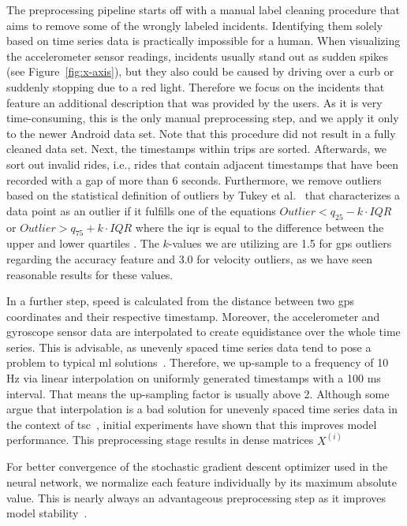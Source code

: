The preprocessing pipeline starts off with a manual label cleaning procedure that aims to remove some of the wrongly labeled incidents.
Identifying them solely based on time series data is practically impossible for a human.
When visualizing the accelerometer sensor readings, incidents usually stand out as sudden spikes (see Figure~\ref{fig:x-axis}), but they also could be caused by driving over a curb or suddenly stopping due to a red light.
Therefore we focus on the incidents that feature an additional description that was provided by the users.
As it is very time-consuming, this is the only manual preprocessing step, and we apply it only to the newer Android data set.
Note that this procedure did not result in a fully cleaned data set.
Next, the timestamps within trips are sorted.
Afterwards, we sort out invalid rides, i.e., rides that contain adjacent timestamps that have been recorded with a gap of more than 6 seconds.
Furthermore, we remove outliers based on the statistical definition of outliers by Tukey et al.~\cite{tukey1977exploratory} that characterizes a data point as an outlier if it fulfills one of the equations $Outlier < q_{25} - k \cdot IQR$ or $Outlier > q_{75} + k \cdot IQR$ where the \ac{iqr} is equal to the difference between the upper and lower quartiles \cite{upton1996understanding, zwillinger1999crc}.
The $k$-values we are utilizing are 1.5 for \ac{gps} outliers regarding the accuracy feature and 3.0 for velocity outliers, as we have seen reasonable results for these values.

In a further step, speed is calculated from the distance between two \ac{gps} coordinates and their respective timestamp.
Moreover, the accelerometer and gyroscope sensor data are interpolated to create equidistance over the whole time series.
This is advisable, as unevenly spaced time series data tend to pose a problem to typical \ac{ml} solutions~\cite{weerakody2021review}.
Therefore, we up-sample to a frequency of 10 Hz via linear interpolation on uniformly generated timestamps with a 100 ms interval.
That means the up-sampling factor is usually above 2.
Although some argue that interpolation is a bad solution for unevenly spaced time series data in the context of \ac{tsc}~\cite{hayashi2005covariance, eckner2012framework}, initial experiments have shown that this improves model performance.
This preprocessing stage results in dense matrices $X^{(i)}$

For better convergence of the stochastic gradient descent optimizer used in the neural network, we normalize each feature individually by its maximum absolute value.
This is nearly always an advantageous preprocessing step as it improves model stability~\cite{bishop1995neural}.

